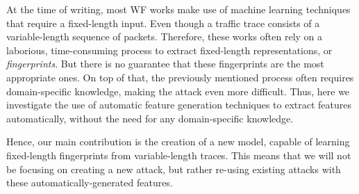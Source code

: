 At the time of writing, most WF works make use of machine learning techniques that require a fixed-length input.
Even though a traffic trace consists of a variable-length sequence of packets.
Therefore, these works often rely on a laborious, time-consuming process to extract fixed-length representations, or \textit{fingerprints}.
But there is no guarantee that these fingerprints are the most appropriate ones.
On top of that, the previously mentioned process often requires domain-specific knowledge, making the attack even more difficult.
Thus, here we investigate the use of automatic feature generation techniques to extract features automatically, without the need for any domain-specific knowledge.

Hence, our main contribution is the creation of a new model, capable of learning fixed-length fingerprints from variable-length traces.
This means that we will not be focusing on creating a new attack, but rather re-using existing attacks with these automatically-generated features.


